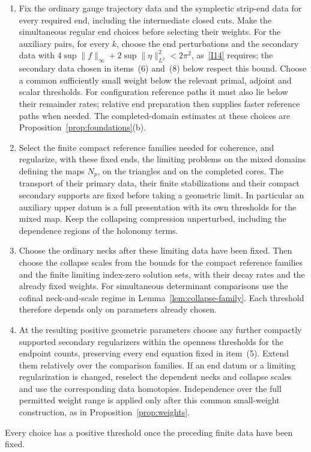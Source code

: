 \documentclass[11pt]{amsart}
\theoremstyle{definition}
\theoremstyle{remark}
\theoremstyle{plain}
\numberwithin{equation}{section}
\begin{document}
\begin{enumerate}[label=(\arabic*)]
norm so small relative to that height that the Lagrangians along the segment from zero to it lie
in $\mathcal N_C$ at that height.
\item Fix the ordinary gauge trajectory data and the symplectic
strip-end data for every required end, including the intermediate
closed cuts. Make the simultaneous regular end choices before
selecting their weights. For the auxiliary pairs, for every $k$, choose the end perturbations
and the secondary data with $4\sup\|f\|_\infty+2\sup\|\eta\|^2_{L^2}<2\pi^2$, as~\ref{I14}
requires; the secondary data chosen in items~(6) and~(8) below respect this bound. Choose a
common sufficiently small weight
below the relevant primal, adjoint and scalar thresholds. For
configuration reference paths it must also lie below their
remainder rates; relative end preparation then supplies faster
reference paths when needed. The completed-domain estimates at
these choices are Proposition~\ref{prop:foundations}(b).
\item Select the finite compact reference families needed for
coherence, and regularize, with these fixed ends, the limiting
problems on the mixed domains defining the maps $N_p$, on the
triangles and on the completed cores. The transport of their
primary data, their finite stabilizations and their compact
secondary supports are fixed before taking a geometric limit. In particular an
auxiliary upper datum is a full presentation with its own
thresholds for the mixed map. Keep the collapsing compression unperturbed,
including the dependence regions of the holonomy terms.
\item Choose the ordinary necks after these limiting data have
been fixed. Then choose the collapse scales from the bounds for
the compact reference families and the finite limiting index-zero
solution sets, with their decay rates and the already fixed
weights. For simultaneous determinant comparisons use the cofinal
neck-and-scale regime in Lemma~\ref{lem:collapse-family}. Each
threshold therefore depends only on parameters already chosen.
\item At the resulting positive geometric parameters choose any
further compactly supported secondary regularizers within the
openness thresholds for the endpoint counts, preserving every
end equation fixed in item~(5). Extend them relatively over the comparison
families. If an end datum or a limiting regularization is changed,
reselect the dependent necks and collapse scales and use the
corresponding data homotopies. Independence over the full permitted
weight range is applied only after this common small-weight
construction, as in Proposition~\ref{prop:weights}.
\end{enumerate}
Every choice has a positive threshold
once the preceding finite data have
been fixed.
\end{document}
